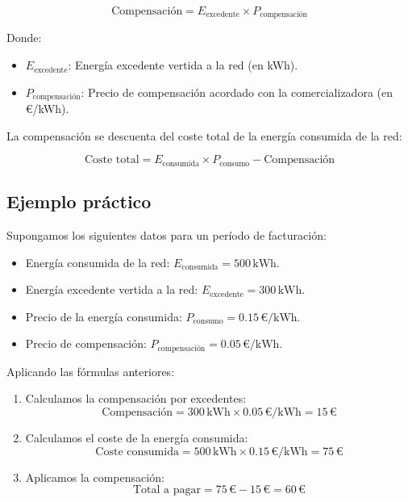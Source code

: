 \documentclass[a4paper,10pt,twocolumn]{article}
\begin{document}
\begin{Form}
	\begin{equation}
		\text{Compensación} = E_{\text{excedente}} \times P_{\text{compensación}}
	\end{equation}

	Donde:
	\begin{itemize}
		\item \( E_{\text{excedente}} \): Energía excedente vertida a la red (en kWh).
		\item \( P_{\text{compensación}} \): Precio de compensación acordado con la comercializadora (en €/kWh).
	\end{itemize}

	La compensación se descuenta del coste total de la energía consumida de la red:

	\begin{equation}
		\text{Coste total} = E_{\text{consumida}} \times P_{\text{consumo}} - \text{Compensación}
	\end{equation}

	\subsection{Ejemplo práctico}
	Supongamos los siguientes datos para un período de facturación:
	\begin{itemize}
		\item Energía consumida de la red: \( E_{\text{consumida}} = 500 \, \text{kWh} \).
		\item Energía excedente vertida a la red: \( E_{\text{excedente}} = 300 \, \text{kWh} \).
		\item Precio de la energía consumida: \( P_{\text{consumo}} = 0.15 \, \text{€/kWh} \).
		\item Precio de compensación: \( P_{\text{compensación}} = 0.05 \, \text{€/kWh} \).
	\end{itemize}

	Aplicando las fórmulas anteriores:
	\begin{enumerate}
		\item Calculamos la compensación por excedentes:
		      \[
			      \text{Compensación} = 300 \, \text{kWh} \times 0.05 \, \text{€/kWh} = 15 \, \text{€}
		      \]

		\item Calculamos el coste de la energía consumida:
		      \[
			      \text{Coste consumida} = 500 \, \text{kWh} \times 0.15 \, \text{€/kWh} = 75 \, \text{€}
		      \]

		\item Aplicamos la compensación:
		      \[
			      \text{Total a pagar} = 75 \, \text{€} - 15 \, \text{€} = 60 \, \text{€}
		      \]
	\end{enumerate}


\end{Form}
\end{document}
